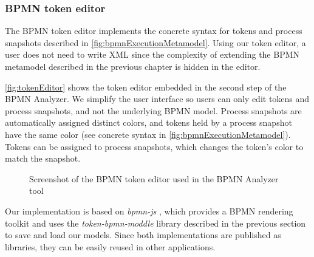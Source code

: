 \documentclass{lmcs} %
\begin{document}
\subsubsection{BPMN token editor}
The BPMN token editor implements the concrete syntax for tokens and process snapshots described in \autoref{fig:bpmnExecutionMetamodel}.
Using our token editor, a user does not need to write XML since the complexity of extending the BPMN metamodel described in the previous chapter is hidden in the editor.

\autoref{fig:tokenEditor} shows the token editor embedded in the second step of the BPMN Analyzer.
We simplify the user interface so users can only edit tokens and process snapshots, and not the underlying BPMN model.
Process snapshots are automatically assigned distinct colors, and tokens held by a process snapshot have the same color (see concrete syntax in \autoref{fig:bpmnExecutionMetamodel}).
Tokens can be assigned to process snapshots, which changes the token's color to match the snapshot.

\begin{figure}[ht]
    \centering
    \caption{Screenshot of the BPMN token editor used in the BPMN Analyzer tool}
    \label{fig:tokenEditor}
\end{figure}

Our implementation is based on \textit{bpmn-js} \cite{camundaservicesgmbhBpmnjs2023}, which provides a BPMN rendering toolkit and uses the \textit{token-bpmn-moddle} library described in the previous section to save and load our models.
Since both implementations are published as libraries, they can be easily reused in other applications.
\end{document}
